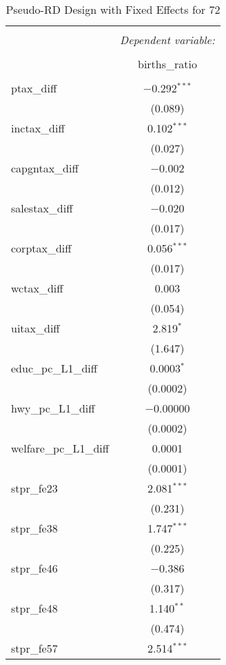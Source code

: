 
\begin{table}[!htbp] \centering 
  \caption{Pseudo-RD Design with Fixed Effects for  72} 
  \label{} 
\begin{tabular}{@{\extracolsep{5pt}}lc} 
\\[-1.8ex]\hline 
\hline \\[-1.8ex] 
 & \multicolumn{1}{c}{\textit{Dependent variable:}} \\ 
\cline{2-2} 
\\[-1.8ex] & births\_ratio \\ 
\hline \\[-1.8ex] 
 ptax\_diff & $-$0.292$^{***}$ \\ 
  & (0.089) \\ 
  inctax\_diff & 0.102$^{***}$ \\ 
  & (0.027) \\ 
  capgntax\_diff & $-$0.002 \\ 
  & (0.012) \\ 
  salestax\_diff & $-$0.020 \\ 
  & (0.017) \\ 
  corptax\_diff & 0.056$^{***}$ \\ 
  & (0.017) \\ 
  wctax\_diff & 0.003 \\ 
  & (0.054) \\ 
  uitax\_diff & 2.819$^{*}$ \\ 
  & (1.647) \\ 
  educ\_pc\_L1\_diff & 0.0003$^{*}$ \\ 
  & (0.0002) \\ 
  hwy\_pc\_L1\_diff & $-$0.00000 \\ 
  & (0.0002) \\ 
  welfare\_pc\_L1\_diff & 0.0001 \\ 
  & (0.0001) \\ 
  stpr\_fe23 & 2.081$^{***}$ \\ 
  & (0.231) \\ 
  stpr\_fe38 & 1.747$^{***}$ \\ 
  & (0.225) \\ 
  stpr\_fe46 & $-$0.386 \\ 
  & (0.317) \\ 
  stpr\_fe48 & 1.140$^{**}$ \\ 
  & (0.474) \\ 
  stpr\_fe57 & 2.514$^{***}$ \\ 

\end{tabular}
\end{table}
